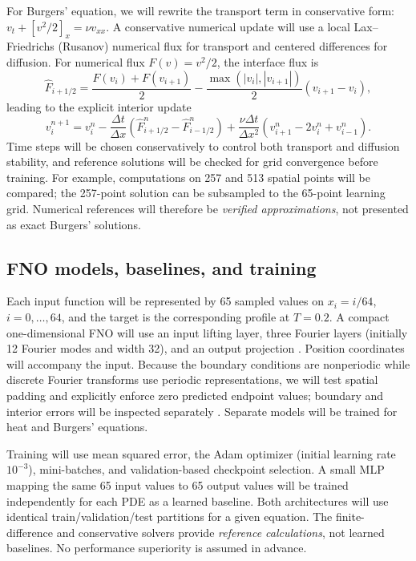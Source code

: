 \documentclass{article}
\begin{document}
For Burgers' equation, we will rewrite the transport term in conservative form: $v_t+[v^2/2]_x=\nu v_{xx}$. A conservative numerical update will use a local Lax--Friedrichs (Rusanov) numerical flux for transport and centered differences for diffusion. For numerical flux $F(v)=v^2/2$, the interface flux is
\begin{equation}
 \widehat F_{i+1/2}=
 \frac{F(v_i)+F(v_{i+1})}{2}
 -\frac{\max(|v_i|,|v_{i+1}|)}{2}(v_{i+1}-v_i),
 \label{eq:flux}
\end{equation}
leading to the explicit interior update
\begin{equation}
 v_i^{n+1}=v_i^n-\frac{\Delta t}{\Delta x}
 (\widehat F_{i+1/2}^n-\widehat F_{i-1/2}^n)
 +\frac{\nu\Delta t}{\Delta x^2}
 (v_{i+1}^n-2v_i^n+v_{i-1}^n).
 \label{eq:burgersscheme}
\end{equation}
Time steps will be chosen conservatively to control both transport and diffusion stability, and reference solutions will be checked for grid convergence before training. For example, computations on 257 and 513 spatial points will be compared; the 257-point solution can be subsampled to the 65-point learning grid. Numerical references will therefore be \emph{verified approximations}, not presented as exact Burgers' solutions.

\subsection{FNO models, baselines, and training}
Each input function will be represented by 65 sampled values on $x_i=i/64$, $i=0,\ldots,64$, and the target is the corresponding profile at $T=0.2$. A compact one-dimensional FNO will use an input lifting layer, three Fourier layers (initially 12 Fourier modes and width 32), and an output projection \citep{li2021fourier}. Position coordinates will accompany the input. Because the boundary conditions are nonperiodic while discrete Fourier transforms use periodic representations, we will test spatial padding and explicitly enforce zero predicted endpoint values; boundary and interior errors will be inspected separately \citep{neuraloperatorguide}. Separate models will be trained for heat and Burgers' equations.

Training will use mean squared error, the Adam optimizer (initial learning rate $10^{-3}$), mini-batches, and validation-based checkpoint selection. A small MLP mapping the same 65 input values to 65 output values will be trained independently for each PDE as a learned baseline. Both architectures will use identical train/validation/test partitions for a given equation. The finite-difference and conservative solvers provide \emph{reference calculations}, not learned baselines. No performance superiority is assumed in advance.
\end{document}
